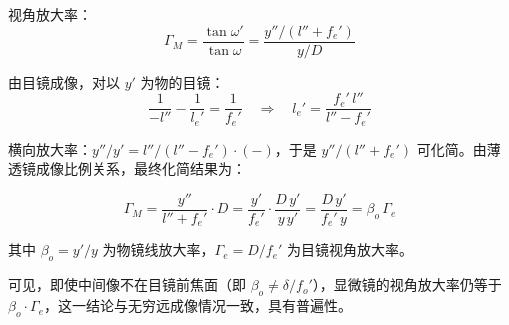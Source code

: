 \documentclass[12pt, a4paper]{article}
\begin{document}
视角放大率：
\begin{equation*}
  \Gamma_M = \frac{\tan\omega'}{\tan\omega} = \frac{y''/(l''+f_e')}{y/D}
\end{equation*}

由目镜成像，对以 $y'$ 为物的目镜：
\begin{equation*}
  \frac{1}{-l''} - \frac{1}{l_e'} = \frac{1}{f_e'} \quad\Rightarrow\quad l_e' = \frac{f_e'\,l''}{l'' - f_e'}
\end{equation*}

横向放大率：$y''/y' = l''/(l''-f_e') \cdot(-) $，于是 $y''/(l''+f_e')$ 可化简。由薄透镜成像比例关系，最终化简结果为：

\begin{equation*}
  \Gamma_M = \frac{y''}{l''+f_e'}\cdot D = \frac{y'}{f_e'}\cdot\frac{D\,y'}{y\,y'} = \frac{D\,y'}{f_e'\,y} = \beta_o\,\Gamma_e
\end{equation*}

其中 $\beta_o = y'/y$ 为物镜线放大率，$\Gamma_e = D/f_e'$ 为目镜视角放大率。

可见，即使中间像不在目镜前焦面（即 $\beta_o \neq \delta/f_o'$），显微镜的视角放大率仍等于 $\beta_o\cdot\Gamma_e$，这一结论与无穷远成像情况一致，具有普遍性。
\end{document}
